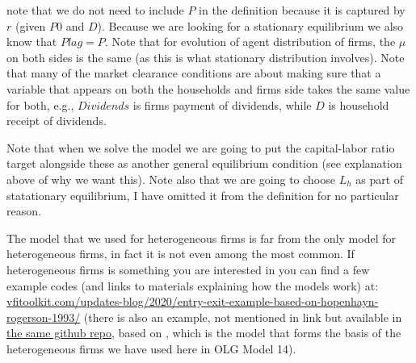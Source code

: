 \noindent note that we do not need to include $P$ in the definition because it is captured by $r$ (given $P0$ and $D$). Because we are looking for a stationary equilibrium we also know that $Plag=P$. Note that for evolution of agent distribution of firms, the $\mu$ on both sides is the same (as this is what stationary distribution involves). Note that many of the market clearance conditions are about making sure that a variable that appears on both the households and firms side takes the same value for both, e.g., $Dividends$ is firms payment of dividends, while $D$ is household receipt of dividends.

Note that when we solve the model we are going to put the capital-labor ratio target alongside these as another general equilibrium condition (see explanation above of why we want this). Note also that we are going to choose $L_h$ as part of statationary equilibrium, I have omitted it from the definition for no particular reason.

The model that we used for heterogeneous firms is far from the only model for heterogeneous firms, in fact it is not even among the most common. If heterogeneous firms is something you are interested in you can find a few example codes (and links to materials explaining how the models work) at:
\href{https://www.vfitoolkit.com/updates-blog/2020/entry-exit-example-based-on-hopenhayn-rogerson-1993/}{vfitoolkit.com/updates-blog/2020/entry-exit-example-based-on-hopenhayn-rogerson-1993/} (there is also an example, not mentioned in link but available in \href{https://github.com/vfitoolkit/VFItoolkit-matlab-examples/tree/master/FirmEntryExitModels}{the same github repo}, based on \cite*{GourioMiao2010}, which is the model that forms the basis of the heterogeneous firms we have used here in OLG Model 14).


